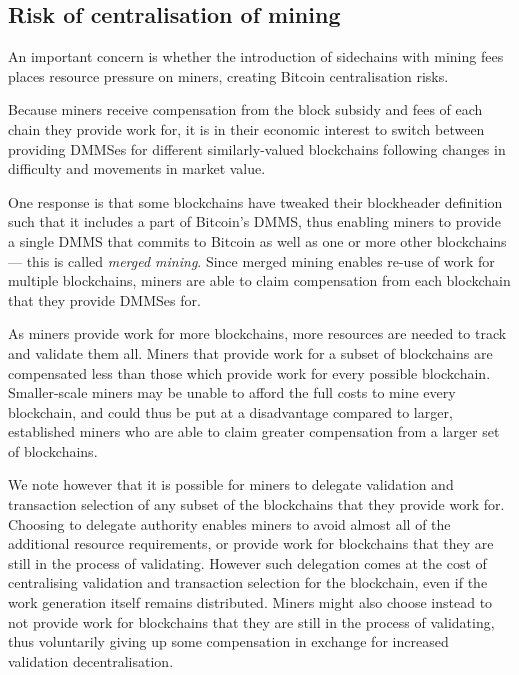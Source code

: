 \documentclass[letterpaper]{article}
\newcommand{\sidechains}{sidechains\xspace}
\newcommand{\hashsig}{DMMS\xspace}
\newcommand{\hashsigs}{DMMSes\xspace}
\begin{document}
\subsection{Risk of centralisation of mining}

An important concern is whether the introduction of \sidechains with mining
fees places resource pressure on miners, creating Bitcoin centralisation risks.

Because miners receive compensation
from the block subsidy and fees of each chain they provide work
for, it is in their economic
interest to switch between providing \hashsigs for different similarly-valued
blockchains following changes in difficulty and movements in market value.

One response is that some blockchains have tweaked their blockheader definition such
that it includes a part of Bitcoin's \hashsig, thus enabling miners to provide a single
\hashsig that commits to Bitcoin as well as one or more other blockchains --- this is
called \emph{merged mining}.
Since merged mining enables re-use of work for multiple blockchains, miners are
able to claim compensation from each blockchain that they provide \hashsigs for.

As miners provide work for more blockchains, more resources are needed
to track and validate them all.
Miners that provide work for a subset of blockchains are compensated less than
those which provide work for every possible blockchain.
Smaller-scale miners may be unable to afford the full costs to mine
every blockchain, and could thus be put at a disadvantage compared to larger,
      established miners who are able to claim greater compensation from a larger
      set of blockchains.

      We note however that it is possible for miners to delegate validation and
      transaction selection of any subset of the blockchains that they provide work for.
      Choosing to delegate authority enables miners to avoid almost all of the
      additional resource requirements, or provide work for blockchains that they
      are still in the process of validating.
      However such delegation comes at the cost of centralising validation and
      transaction selection for the blockchain, even if the work generation itself
      remains distributed.
      Miners might also choose instead to not provide work for blockchains that they
      are still in the process of validating, thus voluntarily giving up some
      compensation in exchange for increased validation decentralisation.
\end{document}

